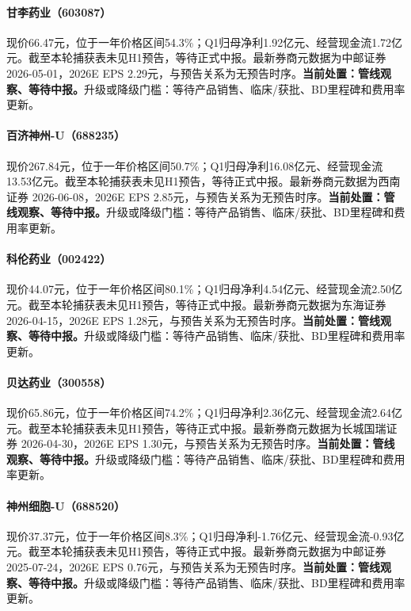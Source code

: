 \paragraph{甘李药业（603087）}
现价66.47元，位于一年价格区间54.3\%；Q1归母净利1.92亿元、经营现金流1.72亿元。截至本轮捕获表未见H1预告，等待正式中报。最新券商元数据为中邮证券 2026-05-01，2026E EPS 2.29元，与预告关系为无预告时序。\textbf{当前处置：管线观察、等待中报。}升级或降级门槛：等待产品销售、临床/获批、BD里程碑和费用率更新。

\paragraph{百济神州-U（688235）}
现价267.84元，位于一年价格区间50.7\%；Q1归母净利16.08亿元、经营现金流13.53亿元。截至本轮捕获表未见H1预告，等待正式中报。最新券商元数据为西南证券 2026-06-08，2026E EPS 2.85元，与预告关系为无预告时序。\textbf{当前处置：管线观察、等待中报。}升级或降级门槛：等待产品销售、临床/获批、BD里程碑和费用率更新。

\paragraph{科伦药业（002422）}
现价44.07元，位于一年价格区间80.1\%；Q1归母净利4.54亿元、经营现金流2.50亿元。截至本轮捕获表未见H1预告，等待正式中报。最新券商元数据为东海证券 2026-04-15，2026E EPS 1.28元，与预告关系为无预告时序。\textbf{当前处置：管线观察、等待中报。}升级或降级门槛：等待产品销售、临床/获批、BD里程碑和费用率更新。

\paragraph{贝达药业（300558）}
现价65.86元，位于一年价格区间74.2\%；Q1归母净利2.36亿元、经营现金流2.64亿元。截至本轮捕获表未见H1预告，等待正式中报。最新券商元数据为长城国瑞证券 2026-04-30，2026E EPS 1.30元，与预告关系为无预告时序。\textbf{当前处置：管线观察、等待中报。}升级或降级门槛：等待产品销售、临床/获批、BD里程碑和费用率更新。

\paragraph{神州细胞-U（688520）}
现价37.37元，位于一年价格区间8.3\%；Q1归母净利-1.76亿元、经营现金流-0.93亿元。截至本轮捕获表未见H1预告，等待正式中报。最新券商元数据为中邮证券 2025-07-24，2026E EPS 0.76元，与预告关系为无预告时序。\textbf{当前处置：管线观察、等待中报。}升级或降级门槛：等待产品销售、临床/获批、BD里程碑和费用率更新。


